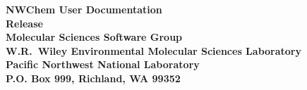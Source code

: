 %
%

\begin{titlepage}

\begin{centering}


{\bf\Huge NWChem User Documentation}\\[0.5in] 
{\bf\Huge Release \nwchemversion}\\[1.0in]

{\bf\Large Molecular Sciences Software Group\\
    W.R.\ Wiley Environmental Molecular Sciences Laboratory\\
    Pacific Northwest National Laboratory\\
    P.O. Box 999, Richland, WA 99352\\[0.5in]}

{\bf\Large \nwchemmonth \ \nwchemyear}\\[1.0in]




\end{centering}

\end{titlepage}
